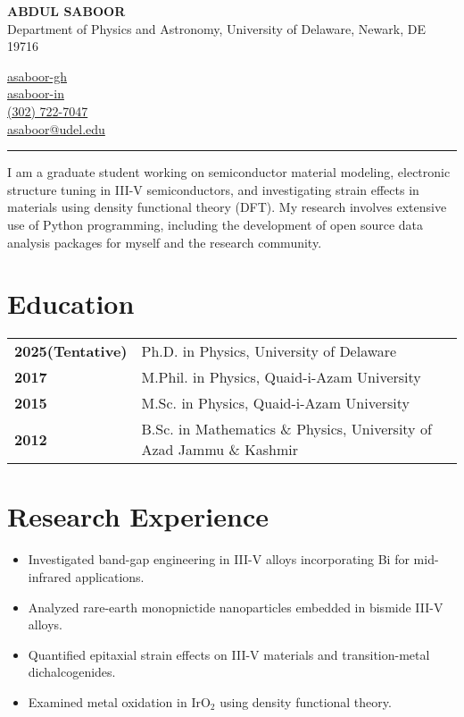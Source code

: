 \documentclass[letter,11pt]{article}
\begin{document}
\begin{minipage}{0.5\textwidth}
    \raggedright
    {\Large \textbf{ABDUL SABOOR}} \\ Department of Physics and Astronomy, University of Delaware, Newark, DE 19716 
\end{minipage}
\hfill
\begin{minipage}{0.3\textwidth}
    \raggedright
    \faGithub \quad \href{https://github.com/asaboor-gh}{asaboor-gh}\\
    \faLinkedin \quad \href{https://linkedin.com/in/asaboor-in}{asaboor-in} \\
    \faPhone \quad \href{tel:+13027227047}{(302) 722-7047} \\
    \faEnvelope \quad \href{mailto:asaboor@udel.edu}{asaboor@udel.edu}
\end{minipage}
\vspace{2mm}
\hrule
\vspace{5mm} \noindent I am a graduate student working on semiconductor material modeling, electronic structure tuning in III-V semiconductors, and investigating strain effects in materials using density functional theory (DFT). My research involves extensive use of Python programming, including the development of open source data analysis packages for myself and the research community.

\section{Education}
\begin{tabular}{p{3cm} p{12cm}}
    \textbf{2025(Tentative)} & Ph.D. in Physics, University of Delaware \\
    \textbf{2017} & M.Phil. in Physics, Quaid-i-Azam University \\
    \textbf{2015} & M.Sc. in Physics, Quaid-i-Azam University \\
    \textbf{2012} & B.Sc. in Mathematics \& Physics, University of Azad Jammu \& Kashmir \\
\end{tabular}

\section{Research Experience}

\begin{itemize}
\item Investigated band-gap engineering in III-V alloys incorporating Bi for mid-infrared applications.
\item Analyzed rare-earth monopnictide nanoparticles embedded in bismide III-V alloys.

\item Quantified epitaxial strain effects on III-V materials and transition-metal dichalcogenides.
\item Examined metal oxidation in IrO$_2$ using density functional theory.
\end{itemize}
\end{document}
